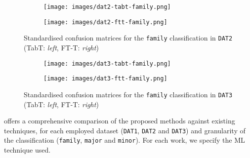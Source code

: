 
\begin{figure}[]
    \centering
    \begin{subfigure}{0.42\textwidth}
        \centering
        \texttt{[image: images/dat2-tabt-family.png]}
        \label{fig:conf-matrix-2a}
    \end{subfigure}
    \begin{subfigure}{0.42\textwidth}
        \centering
        \texttt{[image: images/dat2-ftt-family.png]}
        \label{fig:conf-matrix-2b}
    \end{subfigure}
    \vspace{-15pt}
    \caption{Standardised confusion matrices for the \texttt{family} classification in \texttt{DAT2} (TabT: \textit{left}, FT-T: \textit{right})}
    \label{fig:conf-matrix-dat2}
\end{figure}


\begin{figure}[]
    \centering
    \begin{subfigure}{0.42\textwidth}
        \centering
        \texttt{[image: images/dat3-tabt-family.png]}
        \label{fig:conf-matrix-3a}
    \end{subfigure}
    \begin{subfigure}{0.42\textwidth}
        \centering
        \texttt{[image: images/dat3-ftt-family.png]}
        \label{fig:conf-matrix-3b}
    \end{subfigure}
    \vspace{-15pt}
    \caption{Standardised confusion matrices for the \texttt{family} classification in \texttt{DAT3} (TabT: \textit{left}, FT-T: \textit{right})}
    \label{fig:conf-matrix-dat3}
\end{figure}


\clearpage

 offers a comprehensive comparison of the proposed methods against existing techniques, for each employed dataset (\texttt{DAT1}, \texttt{DAT2} and \texttt{DAT3}) and granularity of the classification (\texttt{family}, \texttt{major} and \texttt{minor}). For each work, we specify the ML technique used.

